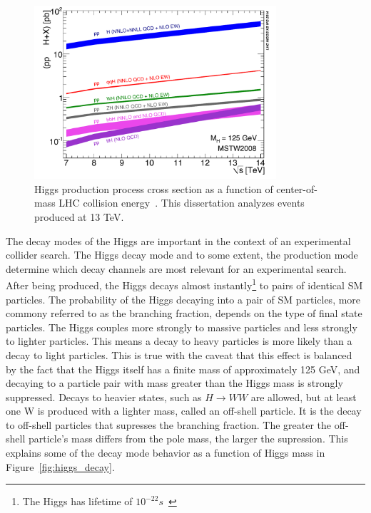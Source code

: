\begin{figure}[hbtp]
 \begin{center}
   \includegraphics[width=0.8\textwidth]{ch2_figs/higgs_prod_xsec.pdf}
   \caption[Higgs production cross section vs LHC collision energy]{Higgs production process cross section as a function of center-of-mass LHC collision energy~\cite{lhchxswg}.
     This dissertation analyzes events produced at 13 TeV.}
   \label{fig:higgs_prod_plot}
 \end{center}
\end{figure}


The decay modes of the Higgs are important in the context of an experimental collider search. The Higgs decay mode and to some extent, the production mode
determine which decay channels are most relevant for an experimental search. After being produced, the Higgs decays almost instantly\footnote{
The Higgs has lifetime of $10^{-22}s$~\cite{pdg}} to pairs of identical SM particles. The probability of the Higgs decaying into a pair of SM particles,
more commony referred to as the branching fraction, depends
on the type of final state particles. The Higgs couples more strongly to massive particles and less strongly to lighter particles. This means a decay to heavy
particles is more likely than a decay to light particles. This is true with the caveat that this effect is balanced by the fact that the Higgs itself has a
finite mass of approximately 125 GeV, and decaying to a particle pair with mass greater than the Higgs mass is strongly suppressed. Decays to heavier
states, such as $H\rightarrow WW$ are allowed, but at least one W is produced with a lighter mass, called an off-shell particle. It is the decay to off-shell
particles that supresses the branching fraction. The greater the off-shell particle's mass differs from the pole mass, the larger the supression.
This explains some of the decay mode behavior as a function of Higgs mass in
Figure~\ref{fig:higgs_decay}.

